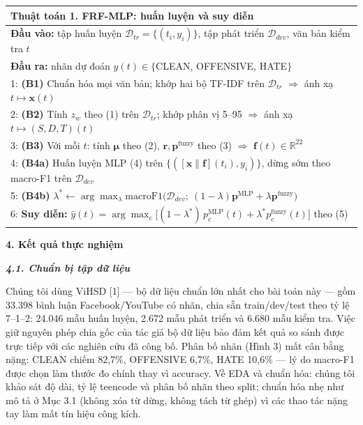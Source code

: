 \documentclass[11pt,a4paper]{article}
\newcommand{\secvn}[1]{\vspace{6pt}\noindent\textbf{#1}\vspace{6pt}\par\nopagebreak}
\newcommand{\subsecvn}[1]{\vspace{6pt}\noindent\textbf{\textit{#1}}\vspace{6pt}\par\nopagebreak}
\begin{document}
\begin{table}[!htb]
\centering
{\fontsize{10}{12}\selectfont
\begin{tabular}{@{}p{15.2cm}@{}}
\toprule
\textbf{Thuật toán 1.} FRF-MLP: huấn luyện và suy diễn\\
\midrule
\textbf{Đầu vào:} tập huấn luyện $\mathcal{D}_{tr}=\{(t_i,y_i)\}$, tập phát triển $\mathcal{D}_{dev}$, văn bản kiểm tra $t$\\
\textbf{Đầu ra:} nhãn dự đoán $\hat{y}(t) \in \{$CLEAN, OFFENSIVE, HATE$\}$\\[2pt]
1: \textbf{(B1)} Chuẩn hóa mọi văn bản; khớp hai bộ TF-IDF trên $\mathcal{D}_{tr}$ $\Rightarrow$ ánh xạ $t \mapsto \mathbf{x}(t)$\\
2: \textbf{(B2)} Tính $z_w$ theo (1) trên $\mathcal{D}_{tr}$; khớp phân vị 5--95 $\Rightarrow$ ánh xạ $t \mapsto (S,D,T)(t)$\\
3: \textbf{(B3)} Với mỗi $t$: tính $\boldsymbol{\mu}$ theo (2), $\mathbf{r}, \mathbf{p}^{\mathrm{fuzzy}}$ theo (3) $\Rightarrow$ $\mathbf{f}(t) \in \mathbb{R}^{22}$\\
4: \textbf{(B4a)} Huấn luyện MLP (4) trên $\{([\mathbf{x}\|\mathbf{f}](t_i), y_i)\}$, dừng sớm theo macro-F1 trên $\mathcal{D}_{dev}$\\
5: \textbf{(B4b)} $\lambda^{*} \leftarrow \arg\max_{\lambda} \mathrm{macroF1}\big(\mathcal{D}_{dev};\ (1-\lambda)\mathbf{p}^{\mathrm{MLP}} + \lambda \mathbf{p}^{\mathrm{fuzzy}}\big)$\\
6: \textbf{Suy diễn:} $\hat{y}(t) = \arg\max_c \big[(1-\lambda^{*})\, p^{\mathrm{MLP}}_c(t) + \lambda^{*} p^{\mathrm{fuzzy}}_c(t)\big]$ theo (5)\\
\bottomrule
\end{tabular}}
\vspace{2pt}
\end{table}

\secvn{4. Kết quả thực nghiệm}

\subsecvn{4.1. Chuẩn bị tập dữ liệu}

Chúng tôi dùng ViHSD [1] — bộ dữ liệu chuẩn lớn nhất cho bài toán này — gồm 33.398 bình luận Facebook/YouTube có nhãn, chia sẵn train/dev/test theo tỷ lệ 7--1--2: 24.046 mẫu huấn luyện, 2.672 mẫu phát triển và 6.680 mẫu kiểm tra. Việc giữ nguyên phép chia gốc của tác giả bộ dữ liệu bảo đảm kết quả so sánh được trực tiếp với các nghiên cứu đã công bố. Phân bố nhãn (Hình 3) mất cân bằng nặng: CLEAN chiếm 82,7\%, OFFENSIVE 6,7\%, HATE 10,6\% — lý do macro-F1 được chọn làm thước đo chính thay vì accuracy. Về EDA và chuẩn hóa: chúng tôi khảo sát độ dài, tỷ lệ teencode và phân bố nhãn theo split; chuẩn hóa nhẹ như mô tả ở Mục 3.1 (không xóa từ dừng, không tách từ ghép) vì các thao tác nặng tay làm mất tín hiệu công kích.
\end{document}
